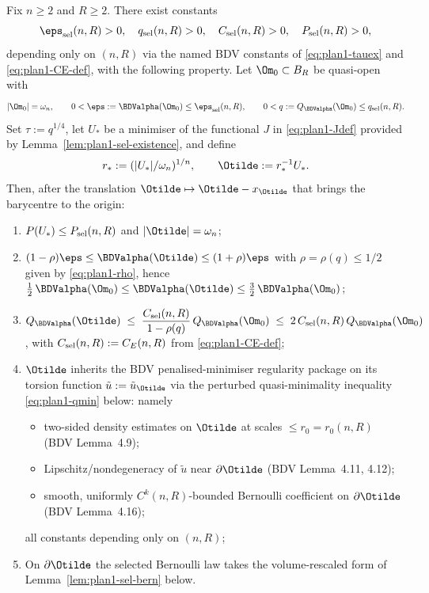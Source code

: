 \begin{theorem}
\label{thm:plan1-sel-main}
Fix $n\ge2$ and $R\ge2$. There exist constants
\[
\eps_{\rm sel}(n,R)>0,\quad q_{\rm sel}(n,R)>0,\quad
C_{\rm sel}(n,R)>0,\quad P_{\rm sel}(n,R)>0,
\]
depending only on $(n,R)$ via the named BDV constants of
\eqref{eq:plan1-tauex} and \eqref{eq:plan1-CE-def},
with the following property. Let $\Om_0\subset B_R$ be quasi-open
with
\[
|\Om_0|=\omega_n,\qquad
0<\eps:=\BDValpha(\Om_0)\le\eps_{\rm sel}(n,R),\qquad
0<q:=Q_{\BDValpha}(\Om_0)\le q_{\rm sel}(n,R).
\]
Set $\tau:=q^{1/4}$, let $U_*$ be a minimiser of the functional $J$ in
\eqref{eq:plan1-Jdef} provided by
Lemma~\ref{lem:plan1-sel-existence}, and define
\[
r_*:=(|U_*|/\omega_n)^{1/n},
\qquad
\Otilde:=r_*^{-1}U_*.
\]
Then, after the translation $\Otilde\mapsto \Otilde-x_{\Otilde}$ that
brings the barycentre to the origin:
\begin{enumerate}
\item[\rm(i)] $P(U_*)\le P_{\rm sel}(n,R)$ and $|\Otilde|=\omega_n$;
\item[\rm(ii)] $(1-\rho)\eps\le \BDValpha(\Otilde)\le (1+\rho)\eps$ with
$\rho=\rho(q)\le 1/2$ given by \eqref{eq:plan1-rho}, hence
$\tfrac12\,\BDValpha(\Om_0)\le \BDValpha(\Otilde)\le \tfrac32\,\BDValpha(\Om_0)$;
\item[\rm(iii)] $\displaystyle
Q_{\BDValpha}(\Otilde)\;\le\;
\frac{C_{\rm sel}(n,R)}{1-\rho(q)}\,Q_{\BDValpha}(\Om_0)
\;\le\; 2\,C_{\rm sel}(n,R)\,Q_{\BDValpha}(\Om_0)
$, with $C_{\rm sel}(n,R):=C_E(n,R)$ from \eqref{eq:plan1-CE-def};
\item[\rm(iv)] $\Otilde$ inherits the BDV penalised-minimiser regularity
package on its torsion function $\tilde u:=\tilde u_{\Otilde}$ via the
perturbed quasi-minimality inequality \eqref{eq:plan1-qmin} below: namely
\begin{itemize}
\item two-sided density estimates on $\Otilde$ at scales
$\le r_0=r_0(n,R)$ (BDV Lemma~4.9);
\item Lipschitz/nondegeneracy of $\tilde u$ near $\partial\Otilde$ (BDV
Lemma~4.11, 4.12);
\item smooth, uniformly $C^{k}(n,R)$-bounded Bernoulli coefficient on
$\partial\Otilde$ (BDV Lemma~4.16);
\end{itemize}
all constants depending only on $(n,R)$;
\item[\rm(v)] On $\partial\Otilde$ the selected Bernoulli law takes the
volume-rescaled form of Lemma~\ref{lem:plan1-sel-bern} below.
\end{enumerate}
\end{theorem}

